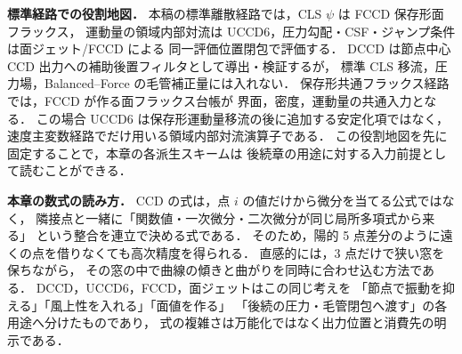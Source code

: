 \medskip
\noindent\textbf{標準経路での役割地図．}
本稿の標準離散経路では，CLS $\psi$ は FCCD 保存形面フラックス，
運動量の領域内部対流は UCCD6，圧力勾配・CSF・ジャンプ条件は面ジェット/FCCD による
同一評価位置閉包で評価する．
DCCD は節点中心 CCD 出力への補助後置フィルタとして導出・検証するが，
標準 CLS 移流，圧力場，Balanced--Force の毛管補正量には入れない．
保存形共通フラックス経路では，FCCD が作る面フラックス台帳が
界面，密度，運動量の共通入力となる．
この場合 UCCD6 は保存形運動量移流の後に追加する安定化項ではなく，
速度主変数経路でだけ用いる領域内部対流演算子である．
この役割地図を先に固定することで，本章の各派生スキームは
後続章の用途に対する入力前提として読むことができる．

\medskip
\noindent\textbf{本章の数式の読み方．}
CCD の式は，点 $i$ の値だけから微分を当てる公式ではなく，
隣接点と一緒に「関数値・一次微分・二次微分が同じ局所多項式から来る」
という整合を連立で決める式である．
そのため，陽的 5 点差分のように遠くの点を借りなくても高次精度を得られる．
直感的には，3 点だけで狭い窓を保ちながら，
その窓の中で曲線の傾きと曲がりを同時に合わせ込む方法である．
DCCD，UCCD6，FCCD，面ジェットはこの同じ考えを
「節点で振動を抑える」「風上性を入れる」「面値を作る」
「後続の圧力・毛管閉包へ渡す」の各用途へ分けたものであり，
式の複雑さは万能化ではなく出力位置と消費先の明示である．

